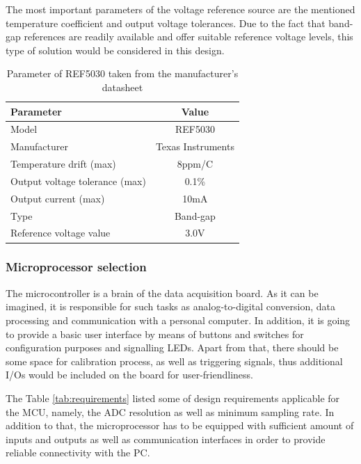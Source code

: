 \documentclass[12pt,a4paper]{article}
\begin{document}
The most important parameters of the voltage reference source are the mentioned temperature coefficient and output voltage tolerances. Due to the fact that band-gap references   are readily available and offer suitable reference voltage levels, this type of solution would be considered in this design.\par

\begin{table}[ht!]
\begin{tabular}{|l|c|}
\hline
\textbf{Parameter}	& \textbf{Value} 	\\ \hline
Model  				& REF5030       \\ \hline
Manufacturer    	& Texas Instruments	\\ \hline
Temperature drift (max)       	&  8ppm/\degree C 	\\\hline
Output voltage tolerance (max)     &  0.1\%			\\ \hline
Output current (max)       & 10mA\\ \hline
Type         &  Band-gap				\\ \hline
Reference voltage value		&  3.0V		\\ \hline

\end{tabular}
\caption{Parameter of REF5030 taken from the manufacturer's datasheet \cite{ref5030_params}}
\label{tab:fer5030_params}
\end{table}

\subsubsection{Microprocessor selection}
The microcontroller is a brain of the data acquisition board. As it can be imagined, it is responsible for such tasks as analog-to-digital conversion, data processing and communication with a personal computer. In addition, it is going to provide a basic user interface by means of buttons and switches for configuration purposes and signalling LEDs. Apart from that, there should be some space for calibration process, as well as triggering signals, thus additional I/Os would be included on the board for user-friendliness.
\par

The Table \ref{tab:requirements} listed some of design requirements applicable for the MCU, namely, the ADC resolution as well as minimum sampling rate. In addition to that, the microprocessor has to be equipped with sufficient amount of inputs and outputs as well as communication interfaces in order to provide reliable connectivity with the PC.
\end{document}
